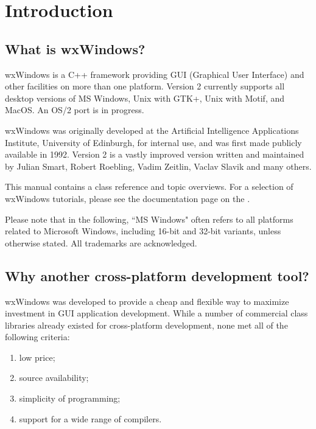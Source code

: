 \chapter{Introduction}\label{introduction}
%
%
\setfooter{\thepage}{}{}{}{}{\thepage}%

\section{What is wxWindows?}

wxWindows is a C++ framework providing GUI (Graphical User
Interface) and other facilities on more than one platform.  Version 2 currently
supports all desktop versions of MS Windows, Unix with GTK+, Unix with Motif,
and MacOS. An OS/2 port is in progress.

wxWindows was originally developed at the Artificial Intelligence
Applications Institute, University of Edinburgh, for internal use,
and was first made publicly available in 1992.
Version 2 is a vastly improved version written and maintained by
Julian Smart, Robert Roebling, Vadim Zeitlin, Vaclav Slavik and many others.

This manual contains a class reference and topic overviews.
For a selection of wxWindows tutorials, please see the documentation page on the .

Please note that in the following, ``MS Windows" often refers to all
platforms related to Microsoft Windows, including 16-bit and 32-bit
variants, unless otherwise stated. All trademarks are acknowledged.

\section{Why another cross-platform development tool?}

wxWindows was developed to provide a cheap and flexible way to maximize
investment in GUI application development.  While a number of commercial
class libraries already existed for cross-platform development,
none met all of the following criteria:

\begin{enumerate}\itemsep=0pt
\item low price;
\item source availability;
\item simplicity of programming;
\item support for a wide range of compilers.
\end{enumerate}

